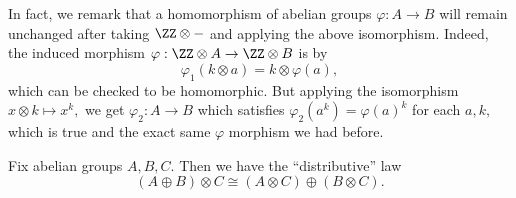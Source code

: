 \begin{remark}[Nir] \label{rem:ringtensoristrivial}
	In fact, we remark that a homomorphism of abelian groups $\varphi:A\to B$ will remain unchanged after taking $\ZZ\otimes-$ and applying the above isomorphism. Indeed, the induced morphism $\varphi:\ZZ\otimes A\to\ZZ\otimes B$ is by
	\[\varphi_1(k\otimes a)=k\otimes\varphi(a),\]
	which can be checked to be homomorphic. But applying the isomorphism $x\otimes k\mapsto x^k,$ we get $\varphi_2:A\to B$ which satisfies $\varphi_2\left(a^k\right)=\varphi(a)^k$ for each $a,k,$ which is true and the exact same $\varphi$ morphism we had before.
\end{remark}
\begin{proposition} \label{prop:tensordist}
	Fix abelian groups $A,B,C.$ Then we have the ``distributive'' law
	\[(A\oplus B)\otimes C\cong(A\otimes C)\oplus(B\otimes C).\]
\end{proposition}
